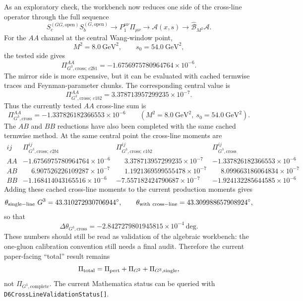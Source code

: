 \documentclass[11pt]{article}
\begin{document}
As an exploratory check, the workbench now reduces one side of the cross-line
operator through the full sequence
\[
  S_c^{(GG,\mathrm{open})}S_b^{(G,\mathrm{open})}
  \rightarrow
  P_1^{\mu\nu}\Pi_{\mu\nu}
  \rightarrow
  \mathcal{A}(x,s)
  \rightarrow
  \widehat{\mathcal B}_{M^2}\mathcal{A}.
\]
For the \(AA\) channel at the central Wang-window point,
\[
  M^2=8.0~\mathrm{GeV}^2,\qquad s_0=54.0~\mathrm{GeV}^2,
\]
the tested side gives
\begin{equation}
  \Pi_{G^3,\mathrm{cross};\,c2b1}^{AA}
  =
  -1.6756975780964764\times 10^{-6}.
\end{equation}
The mirror side is more expensive, but it can be evaluated with cached
termwise traces and Feynman-parameter chunks.  The corresponding central value
is
\begin{equation}
  \Pi_{G^3,\mathrm{cross};\,c1b2}^{AA}
  =
  3.378713957299235\times 10^{-7}.
\end{equation}
Thus the currently tested \(AA\) cross-line sum is
\begin{equation}
  \Pi_{G^3,\mathrm{cross}}^{AA}
  =
  -1.337826182366553\times 10^{-6}
  \qquad
  (M^2=8.0~\mathrm{GeV}^2,\ s_0=54.0~\mathrm{GeV}^2).
\end{equation}
The \(AB\) and \(BB\) reductions have also been completed with the same cached
termwise method.  At the same central point the cross-line moments are
\[
\begin{array}{c|ccc}
ij
&
\Pi_{G^3,\mathrm{cross};\,c2b1}^{ij}
&
\Pi_{G^3,\mathrm{cross};\,c1b2}^{ij}
&
\Pi_{G^3,\mathrm{cross}}^{ij}
\\ \hline
AA
&-1.6756975780964764\times10^{-6}
&\phantom{-}3.378713957299235\times10^{-7}
&-1.337826182366553\times10^{-6}
\\
AB
&\phantom{-}6.907526226109287\times10^{-7}
&\phantom{-}1.1921369599555478\times10^{-7}
&\phantom{-}8.099663186064834\times10^{-7}
\\
BB
&-1.168414043165516\times10^{-6}
&-7.557182424790687\times10^{-7}
&-1.924132285644585\times10^{-6}
\end{array}
\]
Adding these cached cross-line moments to the current production moments gives
\[
  \theta_{\rm single-line~}G^3 = 43.310272930706944^\circ,
  \qquad
  \theta_{\rm with~cross-line} = 43.309988657908924^\circ,
\]
so that
\begin{equation}
  \Delta\theta_{G^3,\mathrm{cross}}
  =
  -2.8427279801945815\times10^{-4}~\mathrm{deg}.
\end{equation}
These numbers should still be read as validation of the algebraic workbench:
the one-gluon calibration convention still needs a final audit.  Therefore the
current paper-facing ``total'' result remains
\[
  \Pi_{\rm total}
  =
  \Pi_{\rm pert}
  +
  \Pi_{G^2}
  +
  \Pi_{G^3,\mathrm{single}},
\]
not \(\Pi_{G^3,\mathrm{complete}}\).  The current Mathematica status can be
queried with \texttt{D6CrossLineValidationStatus[]}.
\end{document}
